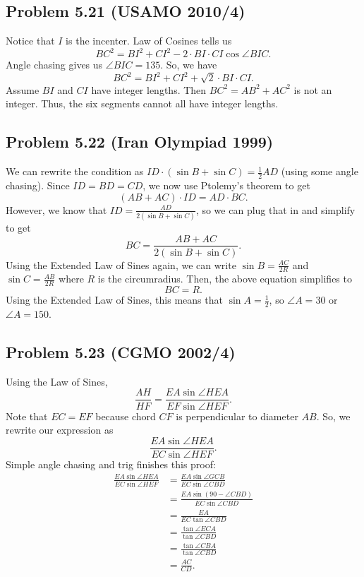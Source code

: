 \documentclass{scrartcl}
\begin{document}
\subsection*{Problem 5.21 (USAMO 2010/4)}
Notice that $I$ is the incenter.
Law of Cosines tells us
\[
    BC^2 = BI^2 + CI^2 - 2 \cdot BI \cdot CI \cos \angle BIC.
\]
Angle chasing gives us $\angle BIC = 135$. So, we have
\[
    BC^2 = BI^2 + CI^2 + \sqrt{2} \cdot BI \cdot CI.
\]
Assume $BI$ and $CI$ have integer lengths. Then $BC^2 = AB^2 + AC^2$ is not an integer. Thus, the six segments cannot all have integer lengths.
\subsection*{Problem 5.22 (Iran Olympiad 1999)}
We can rewrite the condition as $ID \cdot (\sin B + \sin C) = \frac{1}{2} AD$ (using some angle chasing). Since $ID = BD = CD$, we now use Ptolemy's theorem to get
\[
    (AB + AC) \cdot ID = AD \cdot BC.
\]
However, we know that $ID = \frac{AD}{2(\sin B + \sin C)}$, so we can plug that in and simplify to get
\[
    BC = \frac{AB + AC}{2(\sin B + \sin C)}.
\]
Using the Extended Law of Sines again, we can write $\sin B = \frac{AC}{2R}$ and $\sin C = \frac{AB}{2R}$ where $R$ is the circumradius. Then, the above equation simplifies to
\[
    BC = R.
\]
Using the Extended Law of Sines, this means that $\sin A = \frac{1}{2}$, so $\angle A = 30$ or $\angle A = 150$.
\subsection*{Problem 5.23 (CGMO 2002/4)}
Using the Law of Sines,
\[
    \frac{AH}{HF} = \frac{EA \sin \angle HEA}{EF \sin \angle HEF}.
\]
Note that $EC = EF$ because chord $CF$ is perpendicular to diameter $AB$. So, we rewrite our expression as
\[
    \frac{EA \sin \angle HEA}{EC \sin \angle HEF}.
\]
Simple angle chasing and trig finishes this proof:
\begin{align*}
    \frac{EA \sin \angle HEA}{EC \sin \angle HEF} &= \frac{EA \sin \angle GCB}{EC \sin \angle CBD} \\
    &= \frac{EA \sin (90 - \angle CBD)}{EC \sin \angle CBD} \\
    &= \frac{EA}{EC \tan \angle CBD} \\
    &= \frac{\tan \angle ECA}{\tan \angle CBD} \\
    &= \frac{\tan \angle CBA}{\tan \angle CBD} \\
    &= \frac{AC}{CD}.
\end{align*}
\end{document}
